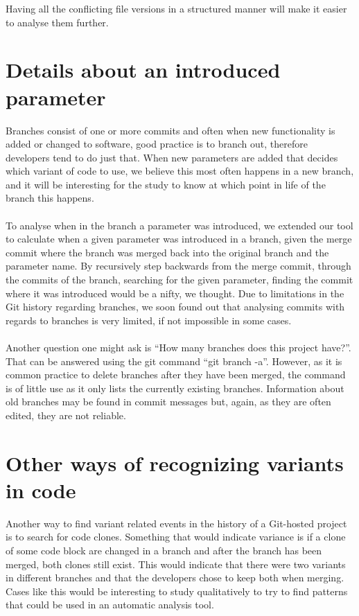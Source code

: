Having all the conflicting file versions in a structured manner will make it easier to analyse them further.
\section{Details about an introduced parameter}
Branches consist of one or more commits and often when new functionality is added or changed to software, good practice is to branch out, therefore developers tend to do just that. When new parameters are added that decides which variant of code to use, we believe this most often happens in a new branch, and it will be interesting for the study to know at which point in life of the branch this happens.
\paragraph*{}
To analyse when in the branch a parameter was introduced, we extended our tool to calculate when a given parameter was introduced in a branch, given the merge commit where the branch was merged back into the original branch and the parameter name. By recursively step backwards from the merge commit, through the commits of the branch, searching for the given parameter, finding the commit where it was introduced would be a nifty, we thought. Due to limitations in the Git history regarding branches, we soon found out that analysing commits with regards to branches is very limited, if not impossible in some cases.
\paragraph*{}
Another question one might ask is “How many branches does this project have?”. That can be answered using the git command “git branch -a”. However, as it is common practice to delete branches after they have been merged, the command is of little use as it only lists the currently existing branches. Information about old branches may be found in commit messages but, again, as they are often edited, they are not reliable.
\section{Other ways of recognizing variants in code}
Another way to find variant related events in the history of a Git-hosted project is to search for code clones. Something that would indicate variance is if a clone of some code block are changed in a branch and after the branch has been merged, both clones still exist. This would indicate that there were two variants in different branches and that the developers chose to keep both when merging. Cases like this would be interesting to study qualitatively to try to find patterns that could be used in an automatic analysis tool.

